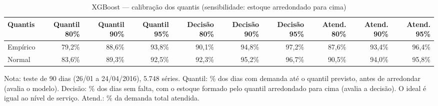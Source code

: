 \begin{table}[htbp]
\centering
\small
\caption{XGBoost — calibração dos quantis (sensibilidade: estoque arredondado para cima)}
\label{tab:xgb_calibracao_sensibilidade}
\begin{tabular}{lrrrrrrrrr}
\toprule
Quantis & Quantil 80\% & Quantil 90\% & Quantil 95\% & Decisão 80\% & Decisão 90\% & Decisão 95\% & Atend. 80\% & Atend. 90\% & Atend. 95\% \\
\midrule
Empírico & 79,2\% & 88,6\% & 93,8\% & 90,1\% & 94,8\% & 97,2\% & 87,6\% & 93,4\% & 96,4\% \\
Normal & 83,6\% & 89,3\% & 92,5\% & 92,3\% & 95,2\% & 96,7\% & 90,5\% & 94,0\% & 95,8\% \\
\bottomrule
\end{tabular}
\par\smallskip
{\footnotesize Nota: teste de 90 dias (26/01 a 24/04/2016), 5.748 séries. Quantil: \% dos dias com demanda até o quantil previsto, antes de arredondar (avalia o modelo). Decisão: \% dos dias sem falta, com o estoque formado pelo quantil arredondado para cima (avalia a decisão). O ideal é igual ao nível de serviço. Atend.: \% da demanda total atendida.}
\end{table}

